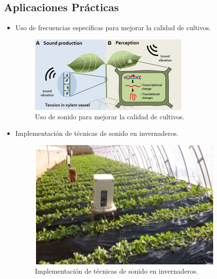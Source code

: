 \documentclass[twocolumn]{article}
\begin{document}
\subsection{Aplicaciones Prácticas}
\begin{itemize}
    \item Uso de frecuencias específicas para mejorar la calidad de cultivos.
    \begin{figure}[!h]
        \centering
        \includegraphics[width=\linewidth]{imagenes/Captura1.PNG}
        \caption{Uso de sonido para mejorar la calidad de cultivos.}
        \label{fig:calidad-cultivos}
    \end{figure}
    
    \item Implementación de técnicas de sonido en invernaderos.
    \begin{figure}[!h]
        \centering
        \includegraphics[width=\linewidth]{imagenes/Captura2.PNG}
        \caption{Implementación de técnicas de sonido en invernaderos.}
        \label{fig:invernaderos}
    \end{figure}
    

\end{itemize}
\end{document}
